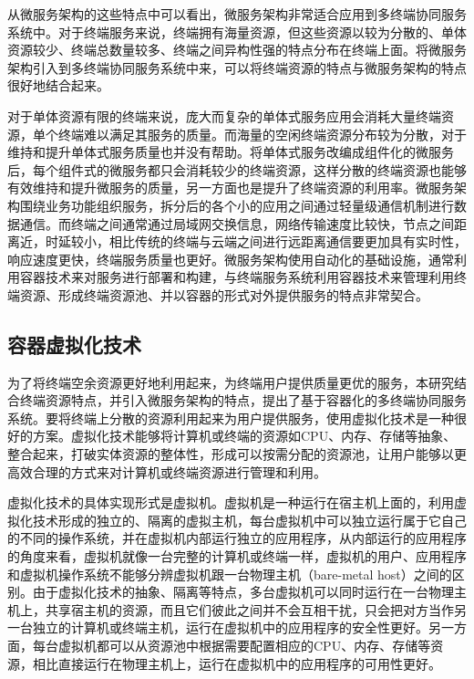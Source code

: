 从微服务架构的这些特点中可以看出，微服务架构非常适合应用到多终端协同服务系统中。对于终端服务来说，终端拥有海量资源，但这些资源以较为分散的、单体资源较少、终端总数量较多、终端之间异构性强的特点分布在终端上面。将微服务架构引入到多终端协同服务系统中来，可以将终端资源的特点与微服务架构的特点很好地结合起来。

对于单体资源有限的终端来说，庞大而复杂的单体式服务应用会消耗大量终端资源，单个终端难以满足其服务的质量。而海量的空闲终端资源分布较为分散，对于维持和提升单体式服务质量也并没有帮助。将单体式服务改编成组件化的微服务后，每个组件式的微服务都只会消耗较少的终端资源，这样分散的终端资源也能够有效维持和提升微服务的质量，另一方面也是提升了终端资源的利用率。微服务架构围绕业务功能组织服务，拆分后的各个小的应用之间通过轻量级通信机制进行数据通信。而终端之间通常通过局域网交换信息，网络传输速度比较快，节点之间距离近，时延较小，相比传统的终端与云端之间进行远距离通信要更加具有实时性，响应速度更快，终端服务质量也更好。微服务架构使用自动化的基础设施，通常利用容器技术来对服务进行部署和构建，与终端服务系统利用容器技术来管理利用终端资源、形成终端资源池、并以容器的形式对外提供服务的特点非常契合。

\subsection{容器虚拟化技术}
为了将终端空余资源更好地利用起来，为终端用户提供质量更优的服务，本研究结合终端资源特点，并引入微服务架构的特点，提出了基于容器化的多终端协同服务系统。要将终端上分散的资源利用起来为用户提供服务，使用虚拟化技术是一种很好的方案。虚拟化技术能够将计算机或终端的资源如CPU、内存、存储等抽象、整合起来，打破实体资源的整体性，形成可以按需分配的资源池，让用户能够以更高效合理的方式来对计算机或终端资源进行管理和利用。

虚拟化技术的具体实现形式是虚拟机。虚拟机是一种运行在宿主机上面的，利用虚拟化技术形成的独立的、隔离的虚拟主机，每台虚拟机中可以独立运行属于它自己的不同的操作系统，并在虚拟机内部运行独立的应用程序，从内部运行的应用程序的角度来看，虚拟机就像一台完整的计算机或终端一样，虚拟机的用户、应用程序和虚拟机操作系统不能够分辨虚拟机跟一台物理主机（bare-metal host）之间的区别。由于虚拟化技术的抽象、隔离等特点，多台虚拟机可以同时运行在一台物理主机上，共享宿主机的资源，而且它们彼此之间并不会互相干扰，只会把对方当作另一台独立的计算机或终端主机，运行在虚拟机中的应用程序的安全性更好。另一方面，每台虚拟机都可以从资源池中根据需要配置相应的CPU、内存、存储等资源，相比直接运行在物理主机上，运行在虚拟机中的应用程序的可用性更好。


